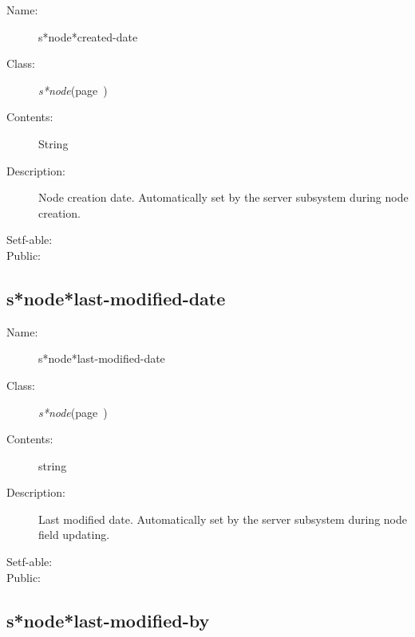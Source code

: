 \begin{description}

\item [Name:]  s*node*created-date

\item [Class:] {\sl s*node}\hfill(page~\pageref{s*node})

\item [Contents:] String

\item [Description:]
Node creation date. Automatically set by 
the server subsystem during node creation.

\item [Setf-able:]

\item [Public:]



\end{description}
\horizontalline

\subsection{s*node*last-modified-date}
\label{s*node*last-modified-date}

\begin{description}

\item [Name:]  s*node*last-modified-date

\item [Class:] {\sl s*node}\hfill(page~\pageref{s*node})

\item [Contents:] string

\item [Description:]
Last modified date.  Automatically 
set by the server subsystem during 
node field updating.

\item [Setf-able:]


\item [Public:]



\end{description}
\horizontalline

\subsection{s*node*last-modified-by}
\label{s*node*last-modified-by}

